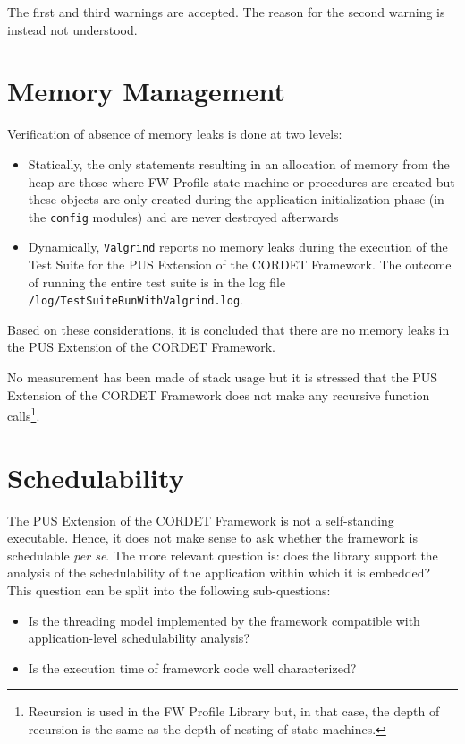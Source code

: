 \documentclass{pnp_article}
\begin{document}
The first and third warnings are accepted. The reason for the second warning is instead not understood.


\section{Memory Management}\label{sec:svrMemMng}
Verification of absence of memory leaks is done at two levels:

\begin{itemize}
\item Statically, the only statements resulting in an allocation of memory from the heap are those where FW Profile state machine or procedures are created but these objects are only created during the application initialization phase (in the \texttt{config} modules) and are never destroyed afterwards
\item Dynamically, \texttt{Valgrind} reports no memory leaks during the execution of the Test Suite for the PUS Extension of the CORDET Framework. The outcome of running the entire test suite is in the log file \texttt{/log/TestSuiteRunWithValgrind.log}.
\end{itemize}

Based on these considerations, it is concluded that there are no memory leaks in the PUS Extension of the CORDET Framework.

No measurement has been made of stack usage but it is stressed that the PUS Extension of the CORDET Framework does not make any recursive function calls\footnote{Recursion is used in the FW Profile Library but, in that case, the depth of recursion is the same as the depth of nesting of state machines.}.



\section{Schedulability}\label{sec:svrSched}
The PUS Extension of the CORDET Framework is not a self-standing executable. Hence, it does not make sense to ask whether the framework is schedulable \textit{per se}. The more relevant question is: does the library support the analysis of the schedulability of the application within which it is embedded? This question can be split into the following sub-questions:

\begin{itemize}
\item Is the threading model implemented by the framework compatible with application-level schedulability analysis?
\item Is the execution time of framework code well characterized?
\end{itemize}
\end{document}
